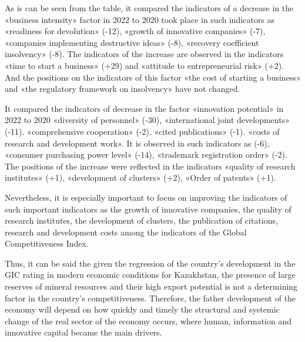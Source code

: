 
As is can be seen from the table, it compared the indicators of a
decrease in the «business intensity» factor in 2022 to 2020 took place
in such indicators as «readiness for devolution» (-12), «growth of
innovative companies» (-7), «companies implementing destructive ideas»
(-8), «recovery coefficient insolvency» (-8). The indicators of the
increase are observed in the indicators «time to start a business» (+29)
and «attitude to entrepreneurial risk» (+2). And the positions on the
indicators of this factor «the cost of starting a business» and «the
regulatory framework on insolvency» have not changed.

It compared the indicators of decrease in the factor «innovation
potential» in 2022 to 2020 «diversity of personnel» (-30),
«international joint developments» (-11). «comprehensive cooperation»
(-2). «cited publications» (-1). «costs of research and development
work». It is observed in such indicators as (-6), «consumer purchasing
power level» (-14), «trademark registration order» (-2). The positions
of the increase were reflected in the indicators «quality of research
institutes» (+1), «development of clusters» (+2), «Order of patents»
(+1).

Nevertheless, it is especially important to focus on improving the
indicators of such important indicators as the growth of innovative
companies, the quality of research institutes, the development of
clusters, the publication of citations, research and development costs
among the indicators of the Global Competitiveness Index.

Thus, it can be said the given the regression of the country's
development in the GIC rating in modern economic conditions for
Kazakhstan, the presence of large reserves of mineral resources and
their high export potential is not a determining factor in the country's
competitiveness. Therefore, the father development of the economy will
depend on how quickly and timely the structural and systemic change of
the real sector of the economy occurs, where human, information and
innovative capital became the main drivers.

